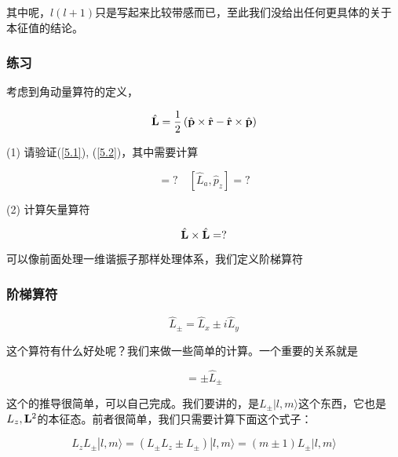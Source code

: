 其中呢，$l(l+1)$只是写起来比较带感而已，至此我们没给出任何更具体的关于本征值的结论。

\subsubsection{练习}
考虑到角动量算符的定义，

\begin{equation}
{\hat{\bf L}} = \displaystyle\frac{1}{2}\left({\hat{\bf p}}\times {\hat{\bf r}} - {\hat{\bf r}}\times {\hat{\bf p}}\right)
\end{equation}

(1) 请验证(\ref{5.1}), (\ref{5.2})，其中需要计算

\begin{equation}
[\hat L_a, \hat r_b] = ? \quad [\hat L_a, \hat p_z] = ? 
\end{equation}

(2) 计算矢量算符

\begin{equation}
\hat{\bf L}\times \hat{\bf L} = ?
\end{equation}

可以像前面处理一维谐振子那样处理体系，我们定义阶梯算符

\subsubsection{阶梯算符}
\begin{equation}
\hat L_{\pm} = \hat L_x \pm i\hat L_y
\end{equation}

这个算符有什么好处呢？我们来做一些简单的计算。一个重要的关系就是

\begin{equation}
[\hat L_z, \hat L_{\pm}] = \pm \hat L_{\pm}
\end{equation}

这个的推导很简单，可以自己完成。我们要讲的，是$L_{\pm}|l,m\rangle$这个东西，它也是$L_z, {\bf L}^2$的本征态。前者很简单，我们只需要计算下面这个式子：

\begin{equation}
L_z L_{\pm}|l,m\rangle = (L_{\pm}L_z \pm L_{\pm})|l,m\rangle = (m\pm 1)L_{\pm}|l,m\rangle
\end{equation}

